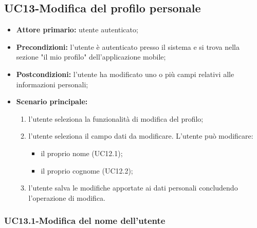 \subsection{UC13-Modifica del profilo personale} 
\begin{itemize}

	\item \textbf{Attore primario:} utente autenticato;

	\item \textbf{Precondizioni:} l'utente è autenticato presso il sistema e si trova nella sezione "il mio profilo" dell'applicazione mobile;

	\item \textbf{Postcondizioni:} l'utente ha modificato uno o più campi relativi alle informazioni personali;

	\item \textbf{Scenario principale:} 
	
		\begin{enumerate}
    		\item  l'utente seleziona la funzionalità di modifica del profilo;
    		\item  l'utente seleziona il campo dati da modificare. L'utente può modificare:
    		
    			\begin{itemize}
        			\item il proprio nome (UC12.1); 
        			\item il proprio cognome (UC12.2); 
    			\end{itemize} 
    			
    		\item l'utente salva le modifiche apportate ai dati personali concludendo l'operazione di modifica.
    		
		\end{enumerate}
		
\end{itemize}


\subsubsection{UC13.1-Modifica del nome dell'utente}

